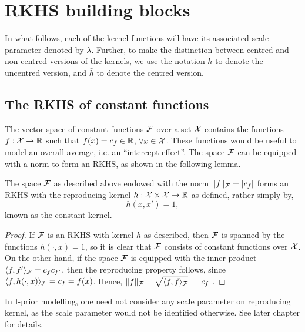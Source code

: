 \documentclass[a4paper,showframe,11pt,draft]{report}
\begin{document}
\section{RKHS building blocks}

In what follows, each of the kernel functions will have its associated scale parameter denoted by $\lambda$.
Further, to make the distinction between centred and non-centred versions of the kernels, we use the notation $h$ to denote the uncentred version, and $\bar h$ to denote the centred version.

\subsection{The RKHS of constant functions}

The vector space of constant functions ${\mathcal F}$ over a set ${\mathcal X}$ contains the functions $f:{\mathcal X} \to \mathbb{R}$ such that $f(x) = c_f \in \mathbb{R}$, $\forall x \in {\mathcal X}$.
These functions would be useful to model an overall average, i.e. an ``intercept effect''.
The space ${\mathcal F}$ can be equipped with a norm to form an RKHS, as shown in the following lemma.

\begin{proposition}[RKHS of constant functions]
  The space ${\mathcal F}$ as described above endowed with the norm $\lVert f\rVert_{\mathcal F} = \vert c_f \vert$ forms an RKHS with the reproducing kernel $h:{\mathcal X}\times{\mathcal X}\to\mathbb{R}$ as defined, rather simply by,
  \[
    h(x,x') = 1,
  \]
  known as the constant kernel.
\end{proposition}

\begin{proof}
  If ${\mathcal F}$ is an RKHS with kernel $h$ as described, then ${\mathcal F}$ is spanned by the  functions $h(\cdot,x) = 1$, so it is clear that ${\mathcal F}$ consists of constant functions over ${\mathcal X}$.
  On the other hand, if the space ${\mathcal F}$ is equipped with the inner product $\langle f,f'\rangle_{\mathcal F} = c_f c_{f'}$, then the reproducing property follows, since $\langle f,h(\cdot,x)\rangle_{\mathcal F} = c_f = f(x)$.
  Hence, $\lVert f\rVert_{\mathcal F} = \sqrt{\langle f,f\rangle_{\mathcal F}} = \vert c_f \vert$.
\end{proof}

In I-prior modelling, one need not consider any scale parameter on reproducing kernel, as the scale parameter would not be identified otherwise.
See later chapter for details.
\end{document}
